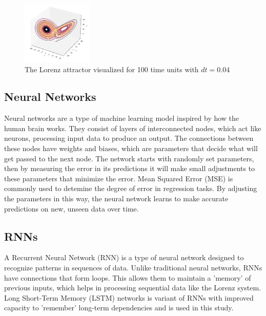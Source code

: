 \documentclass[11pt]{article}
\begin{document}
\begin{figure}[h]

\centering
\includegraphics[width=0.3\textwidth]{lorenz_attractor.jpeg}
\caption{The Lorenz attractor visualized for 100 time units with $dt=0.04$}
\label{fig:lorenz_attractor}
\end{figure}

\subsection{Neural Networks}

Neural networks are a type of machine learning model inspired by how the human brain works. They consist of layers of interconnected nodes, which act like neurons, processing input data to produce an output. The connections between these nodes have weights and biases, which are parameters that decide what will get passed to the next node. The network starts with randomly set parameters, then by measuring the error in its predictions it will make small adjustments to these parameters that minimize the error. Mean Squared Error (MSE) is commonly used to detemine the degree of error in regression tasks. By adjusting the parameters in this way, the neural network learns to make accurate predictions on new, unseen data over time.


\subsection{RNNs}

A Recurrent Neural Network (RNN) is a type of neural network designed to recognize patterns in sequences of data. Unlike traditional neural networks, RNNs have connections that form loops. This allows them to maintain a 'memory' of previous inputs, which helps in processing sequential data like the Lorenz system. Long Short-Term Memory (LSTM) networks is variant of RNNs with improved capacity to 'remember' long-term dependencies and is used in this study.  
\end{document}
